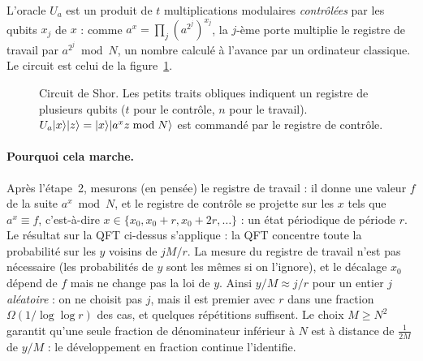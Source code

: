 L'oracle $U_a$ est un produit de $t$ multiplications modulaires \emph{contrôlées} par les qubits $x_j$ de $x$ :
comme $a^x=\prod_j(a^{2^j})^{x_j}$, la $j$-ème porte multiplie le registre de travail par $a^{2^j}\bmod N$, un
nombre calculé à l'avance par un ordinateur classique. Le circuit est celui de la
figure~\ref{fig:shor-circ}.

\begin{figure}[!ht]
\centering
{}
\caption{Circuit de Shor. Les petits traits obliques indiquent un registre de plusieurs qubits ($t$ pour le
contrôle, $n$ pour le travail). $U_a|x\rangle|z\rangle=|x\rangle|a^xz\bmod N\rangle$ est commandé par le registre de
contrôle.}
\label{fig:shor-circ}
\end{figure}

\paragraph{Pourquoi cela marche.} Après l'étape~2, mesurons (en pensée) le registre de travail : il
donne une valeur $f$ de la suite $a^x\bmod N$, et le registre de contrôle se projette sur les $x$ tels que
$a^x\equiv f$, c'est-à-dire $x\in\{x_0,x_0+r,x_0+2r,\ldots\}$ : un état périodique de période $r$. Le résultat sur la QFT
ci-dessus s'applique : la QFT concentre toute la probabilité sur les $y$ voisins de $jM/r$. La mesure du
registre de travail n'est pas nécessaire (les probabilités de $y$ sont les mêmes si on l'ignore), et le
décalage $x_0$ dépend de $f$ mais ne change pas la loi de $y$. Ainsi $y/M\approx j/r$ pour un entier $j$ \emph{aléatoire} :
on ne choisit pas $j$, mais il est premier avec $r$ dans une fraction $\Omega(1/\log\log r)$ des cas, et quelques
répétitions suffisent. Le choix $M\geq N^2$ garantit qu'une seule fraction de dénominateur inférieur à $N$ est
à distance de $\frac{1}{2M}$ de $y/M$ : le développement en fraction continue l'identifie.

